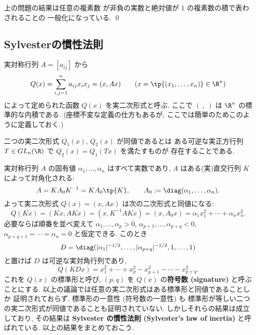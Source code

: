 \documentclass[12pt,twoside]{jarticle}
\begin{document}
\begin{guide}
  上の問題の結果は任意の複素数
  が非負の実数と絶対値が $1$ の複素数の積で表わされることの
  一般化になっている. \qed
\end{guide}


\subsection{Sylvesterの慣性法則}

実対称行列 $A=[a_{ij}]$ から 
\begin{equation*}
  Q(x) = \sum_{i,j=1}^n a_{ij}x_ix_j =(x,Ax)
  \qquad (x=\tp{(x_1,\ldots,x_n)}\in\R^n)
\end{equation*}
によって定められた函数 $Q(x)$ を実二次形式と呼ぶ.
ここで $(\ ,\ )$ は $\R^n$ の標準的な内積である.
(座標不変な定義の仕方もあるが, ここでは簡単のためこのように定義しておく.)

二つの実二次形式 $Q_1(x)$, $Q_2(x)$ が同値であるとは
ある可逆な実正方行列 $T\in GL_n(\R)$ で $Q_2(x)=Q_1(Tx)$ を満たすものが
存在することである.

実対称行列 $A$ の固有値 $\alpha_1,\ldots,\alpha_n$ はすべて実数であり, %
$A$ はある(実)直交行列 $K$ によって対角化される:
\begin{equation*}
  A = K A_0 K^{-1} = K A_0 \tp{K},
  \qquad
  A_0 := \diag(\alpha_1,\ldots,\alpha_n).
\end{equation*}
よって実二次形式 $Q(x)=(x,Ax)$ は次の二次形式と同値になる:
\begin{equation*}
  Q(Kx) = (Kx,AKx) = (x,K^{-1}AKx) = (x,A_0x)
  = \alpha_1 x_1^2 + \cdots + \alpha_n x_n^2.
\end{equation*}
必要ならば順番を並べ変えて %
$\alpha_1,\ldots,\alpha_p>0$, %
$\alpha_{p+1},\ldots,\alpha_{p+q}<0$, %
$\alpha_{p+q+1}=\cdots=\alpha_n=0$ と仮定できる.
このとき
\begin{equation*}
  D = \diag(|\alpha_1|^{-1/2},\ldots,|\alpha_{p+q}|^{-1/2},1,\ldots,1)
\end{equation*}
と置けば $D$ は可逆な実対角行列であり,
\begin{equation*}
  Q(KDx) 
  = x_1^2 + \cdots + x_p^2 - x_{p+1}^2 - \cdots - x_{p+q}^2.
\end{equation*}
これを $Q(x)$ の標準形と呼び, %
$(p,q)$ を $Q(x)$ の{\bf 符号数 (signature)} と呼ぶことにする.
以上の議論では任意の実二次形式はある標準形と同値であることしか
証明されておらず, 
標準形の一意性 (符号数の一意性) も
標準形が等しい二つの実二次形式が同値であることも証明されていない.
しかしそれらの結果は成立しており, 
その結果は {\bf Sylvester の慣性法則 (Sylvester's law of inertia)} 
と呼ばれている.
以上の結果をまとめておこう.
\end{document}

